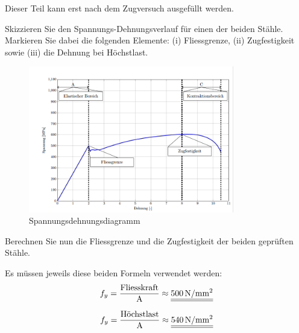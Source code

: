 \begin{questions}
    \begin{tcolorbox}
        Dieser Teil kann erst nach dem Zugversuch ausgefüllt werden.
    \end{tcolorbox}

    \question
    Skizzieren Sie den Spannungs-Dehnungsverlauf für einen der beiden Stähle.
    Markieren Sie dabei die folgenden Elemente: (i) Fliessgrenze, (ii) Zugfestigkeit sowie (iii) die Dehnung bei Höchstlast.

    \begin{solution}
        \begin{figure}[H]
            \centering
            \includegraphics[width=0.8\textwidth]{Lsg}
            \caption{Spannungsdehnungsdiagramm}
            \label{fig:Spannungsdehnungsdiagramm}
        \end{figure}
    \end{solution}

    \question
    Berechnen Sie nun die Fliessgrenze und die Zugfestigkeit der beiden geprüften Stähle.

    \begin{solution}
        Es müssen jeweils diese beiden Formeln verwendet werden:
        \begin{equation*}
            f_{y}  =
            \dfrac{\text{Fliesskraft}}{\text{A}} \approx \FinRes{\myNmm{500}}
        \end{equation*}


        \begin{equation*}
            f_{y}  =
            \dfrac{\text{Höchstlast}}{\text{A}} \approx \FinRes{\myNmm{540}}
        \end{equation*}

    \end{solution}




\end{questions}

